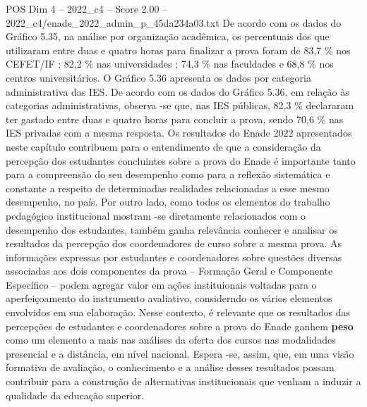 \begin{textsample}{POS Dim 4 – 2022\_c4 – Score 2.00 – 2022\_c4/enade\_2022\_admin\_p\_45da234a03.txt}
De acordo com os dados do Gráfico 5.35, na análise por organização acadêmica, os percentuais dos que utilizaram entre duas e quatro horas para finalizar a prova foram de 83,7 \% nos CEFET/IF ; 82,2 \% nas universidades ; 74,3 \% nas faculdades e 68,8 \% nos centros universitários.
O Gráfico 5.36 apresenta os dados por categoria administrativa das IES.
De acordo com os dados do Gráfico 5.36, em relação às categorias administrativas, observa -se que, nas IES públicas, 82,3 \% declararam ter gastado entre duas e quatro horas para concluir a prova, sendo 70,6 \% nas IES privadas com a mesma resposta.
Os resultados do Enade 2022 apresentados neste capítulo contribuem para o entendimento de que a consideração da percepção dos estudantes concluintes sobre a prova do Enade é importante tanto para a compreensão do seu desempenho como para a reflexão sistemática e constante a respeito de determinadas realidades relacionadas a esse mesmo desempenho, no país.
Por outro lado, como todos os elementos do trabalho pedagógico institucional mostram -se diretamente relacionados com o desempenho dos estudantes, também ganha relevância conhecer e analisar os resultados da percepção dos coordenadores de curso sobre a mesma prova.
As informações expressas por estudantes e coordenadores sobre questões diversas associadas aos dois componentes da prova – Formação Geral e Componente Específico – podem agregar valor em ações instituionais voltadas para o aperfeiçoamento do instrumento avaliativo, considerndo os vários elementos envolvidos em sua elaboração.
Nesse contexto, é relevante que os resultados das percepções de estudantes e coordenadores sobre a prova do Enade ganhem \textbf{peso} como um elemento a mais nas análises da oferta dos cursos nas modalidades presencial e a distância, em nível nacional.
Espera -se, assim, que, em uma visão formativa de avaliação, o conhecimento e a análise desses resultados possam contribuir para a construção de alternativas institucionais que venham a induzir a qualidade da educação superior.

\end{textsample}
